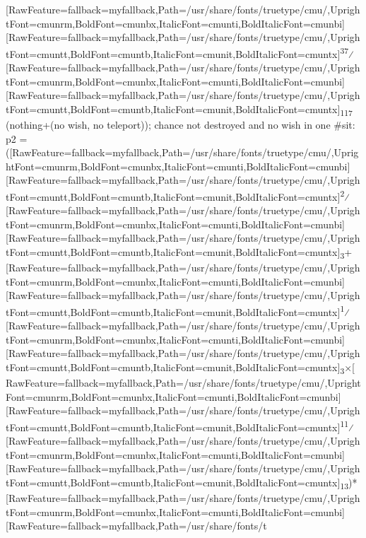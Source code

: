\begin{myenumerate}
\allowbreak{}\setmainfont{cmunrm.ttf}[RawFeature={fallback=myfallback},Path=/usr/share/fonts/truetype/cmu/,UprightFont=cmunrm,BoldFont=cmunbx,ItalicFont=cmunti,BoldItalicFont=cmunbi]\setmonofont{cmunrm.ttf}[RawFeature={fallback=myfallback},Path=/usr/share/fonts/truetype/cmu/,UprightFont=cmuntt,BoldFont=cmuntb,ItalicFont=cmunit,BoldItalicFont=cmuntx]\textsuperscript{37}⁄\allowbreak{}\setmainfont{cmunrm.ttf}[RawFeature={fallback=myfallback},Path=/usr/share/fonts/truetype/cmu/,UprightFont=cmunrm,BoldFont=cmunbx,ItalicFont=cmunti,BoldItalicFont=cmunbi]\setmonofont{cmunrm.ttf}[RawFeature={fallback=myfallback},Path=/usr/share/fonts/truetype/cmu/,UprightFont=cmuntt,BoldFont=cmuntb,ItalicFont=cmunit,BoldItalicFont=cmuntx]\textsubscript{117} (nothing+(no wish, no teleport)); chance not destroyed and no wish in one \#sit: p2 = (\allowbreak{}\setmainfont{cmunrm.ttf}[RawFeature={fallback=myfallback},Path=/usr/share/fonts/truetype/cmu/,UprightFont=cmunrm,BoldFont=cmunbx,ItalicFont=cmunti,BoldItalicFont=cmunbi]\setmonofont{cmunrm.ttf}[RawFeature={fallback=myfallback},Path=/usr/share/fonts/truetype/cmu/,UprightFont=cmuntt,BoldFont=cmuntb,ItalicFont=cmunit,BoldItalicFont=cmuntx]\textsuperscript{2}⁄\allowbreak{}\setmainfont{cmunrm.ttf}[RawFeature={fallback=myfallback},Path=/usr/share/fonts/truetype/cmu/,UprightFont=cmunrm,BoldFont=cmunbx,ItalicFont=cmunti,BoldItalicFont=cmunbi]\setmonofont{cmunrm.ttf}[RawFeature={fallback=myfallback},Path=/usr/share/fonts/truetype/cmu/,UprightFont=cmuntt,BoldFont=cmuntb,ItalicFont=cmunit,BoldItalicFont=cmuntx]\textsubscript{3}+\allowbreak{}\setmainfont{cmunrm.ttf}[RawFeature={fallback=myfallback},Path=/usr/share/fonts/truetype/cmu/,UprightFont=cmunrm,BoldFont=cmunbx,ItalicFont=cmunti,BoldItalicFont=cmunbi]\setmonofont{cmunrm.ttf}[RawFeature={fallback=myfallback},Path=/usr/share/fonts/truetype/cmu/,UprightFont=cmuntt,BoldFont=cmuntb,ItalicFont=cmunit,BoldItalicFont=cmuntx]\textsuperscript{1}⁄\allowbreak{}\setmainfont{cmunrm.ttf}[RawFeature={fallback=myfallback},Path=/usr/share/fonts/truetype/cmu/,UprightFont=cmunrm,BoldFont=cmunbx,ItalicFont=cmunti,BoldItalicFont=cmunbi]\setmonofont{cmunrm.ttf}[RawFeature={fallback=myfallback},Path=/usr/share/fonts/truetype/cmu/,UprightFont=cmuntt,BoldFont=cmuntb,ItalicFont=cmunit,BoldItalicFont=cmuntx]\textsubscript{3}×\allowbreak{}\setmainfont{cmunrm.ttf}[RawFeature={fallback=myfallback},Path=/usr/share/fonts/truetype/cmu/,UprightFont=cmunrm,BoldFont=cmunbx,ItalicFont=cmunti,BoldItalicFont=cmunbi]\setmonofont{cmunrm.ttf}[RawFeature={fallback=myfallback},Path=/usr/share/fonts/truetype/cmu/,UprightFont=cmuntt,BoldFont=cmuntb,ItalicFont=cmunit,BoldItalicFont=cmuntx]\textsuperscript{11}⁄\allowbreak{}\setmainfont{cmunrm.ttf}[RawFeature={fallback=myfallback},Path=/usr/share/fonts/truetype/cmu/,UprightFont=cmunrm,BoldFont=cmunbx,ItalicFont=cmunti,BoldItalicFont=cmunbi]\setmonofont{cmunrm.ttf}[RawFeature={fallback=myfallback},Path=/usr/share/fonts/truetype/cmu/,UprightFont=cmuntt,BoldFont=cmuntb,ItalicFont=cmunit,BoldItalicFont=cmuntx]\textsubscript{13})*\allowbreak{}\setmainfont{cmunrm.ttf}[RawFeature={fallback=myfallback},Path=/usr/share/fonts/truetype/cmu/,UprightFont=cmunrm,BoldFont=cmunbx,ItalicFont=cmunti,BoldItalicFont=cmunbi]\setmonofont{cmunrm.ttf}[RawFeature={fallback=myfallback},Path=/usr/share/fonts/t
\end{myenumerate}
